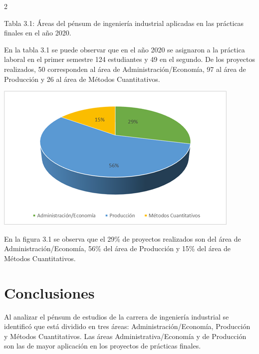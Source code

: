 \documentclass[12pt,spanish,Letterpaper,openany]{book}
\begin{document}
\begin {multicols}{2}
\begin {center}
\begin{minipage}[c]{\columnwidth}
Tabla 3.1: Áreas del pénsum de ingeniería industrial aplicadas en las prácticas finales en el año 2020.

\end{minipage}

\end {center}

En la tabla 3.1 se puede observar que en el año 2020 se asignaron a la práctica laboral en el primer semestre 124 estudiantes y 49 en el segundo. De los proyectos realizados, 50 corresponden al área de Administración/Economía, 97 al área de Producción y 26 al área de Métodos Cuantitativos.

\begin {flushleft}
\noindent\begin{minipage}[c]{\columnwidth}

\includegraphics[width=1\linewidth]{images/02_02}

\end{minipage}

\end {flushleft}

En la figura 3.1 se observa que el 29\% de proyectos realizados son del área de Administración/Economía,
56\% del área de Producción y 15\% del área de Métodos Cuantitativos.

\hypertarget{conclusiones}{%
\section{Conclusiones}\label{conclusiones}}

Al analizar el pénsum de estudios de la carrera de ingeniería industrial se identificó que está
dividido en tres áreas: Administración/Economía, Producción y Métodos Cuantitativos. Las áreas
Administrativa/Economía y de Producción son las de mayor aplicación en los proyectos de
prácticas finales.


\end{multicols}
\end{document}

